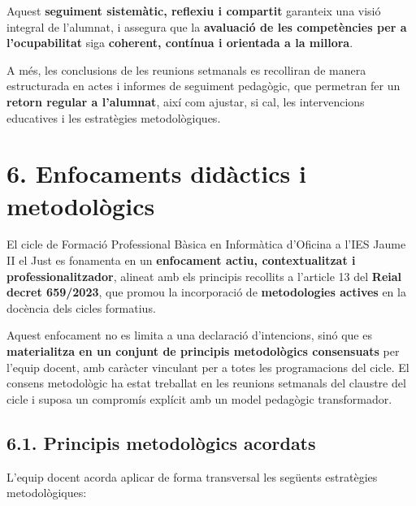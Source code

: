 \documentclass[
  paper=a4,
  ,captions=tableheading
]{scrartcl}
\begin{document}
Aquest \textbf{seguiment sistemàtic, reflexiu i compartit} garanteix una
visió integral de l'alumnat, i assegura que la \textbf{avaluació de les
competències per a l'ocupabilitat} siga \textbf{coherent, contínua i
orientada a la millora}.

A més, les conclusions de les reunions setmanals es recolliran de manera
estructurada en actes i informes de seguiment pedagògic, que permetran
fer un \textbf{retorn regular a l'alumnat}, així com ajustar, si cal,
les intervencions educatives i les estratègies metodològiques.

\hypertarget{enfocaments-diduxe0ctics-i-metodoluxf2gics}{%
\section{6. Enfocaments didàctics i
metodològics}\label{enfocaments-diduxe0ctics-i-metodoluxf2gics}}

El cicle de Formació Professional Bàsica en Informàtica d'Oficina a
l'IES Jaume II el Just es fonamenta en un \textbf{enfocament actiu,
contextualitzat i professionalitzador}, alineat amb els principis
recollits a l'article 13 del \textbf{Reial decret 659/2023}, que promou
la incorporació de \textbf{metodologies actives} en la docència dels
cicles formatius.

Aquest enfocament no es limita a una declaració d'intencions, sinó que
es \textbf{materialitza en un conjunt de principis metodològics
consensuats} per l'equip docent, amb caràcter vinculant per a totes les
programacions del cicle. El consens metodològic ha estat treballat en
les reunions setmanals del claustre del cicle i suposa un compromís
explícit amb un model pedagògic transformador.

\hypertarget{principis-metodoluxf2gics-acordats}{%
\subsection{6.1. Principis metodològics
acordats}\label{principis-metodoluxf2gics-acordats}}

L'equip docent acorda aplicar de forma transversal les següents
estratègies metodològiques:
\end{document}
